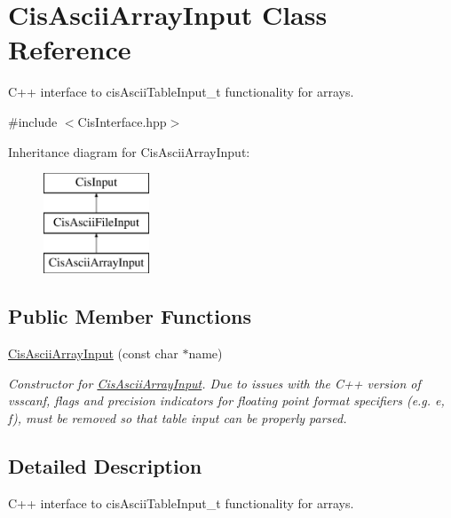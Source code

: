 \hypertarget{classCisAsciiArrayInput}{}\section{Cis\+Ascii\+Array\+Input Class Reference}
\label{classCisAsciiArrayInput}


C++ interface to cis\+Ascii\+Table\+Input\+\_\+t functionality for arrays.  




{\ttfamily \#include $<$Cis\+Interface.\+hpp$>$}

Inheritance diagram for Cis\+Ascii\+Array\+Input\+:\begin{figure}[H]
\begin{center}
\leavevmode
\includegraphics[height=3.000000cm]{classCisAsciiArrayInput}
\end{center}
\end{figure}
\subsection*{Public Member Functions}
\begin{DoxyCompactItemize}
\item 
\mbox{\hyperlink{classCisAsciiArrayInput_a5b93411bc0df794c6f6a3189d2e02289}{Cis\+Ascii\+Array\+Input}} (const char $\ast$name)
\begin{DoxyCompactList}\small\item\em Constructor for \mbox{\hyperlink{classCisAsciiArrayInput}{Cis\+Ascii\+Array\+Input}}. Due to issues with the C++ version of vsscanf, flags and precision indicators for floating point format specifiers (e.\+g. e, f), must be removed so that table input can be properly parsed. \end{DoxyCompactList}\end{DoxyCompactItemize}


\subsection{Detailed Description}
C++ interface to cis\+Ascii\+Table\+Input\+\_\+t functionality for arrays. 

